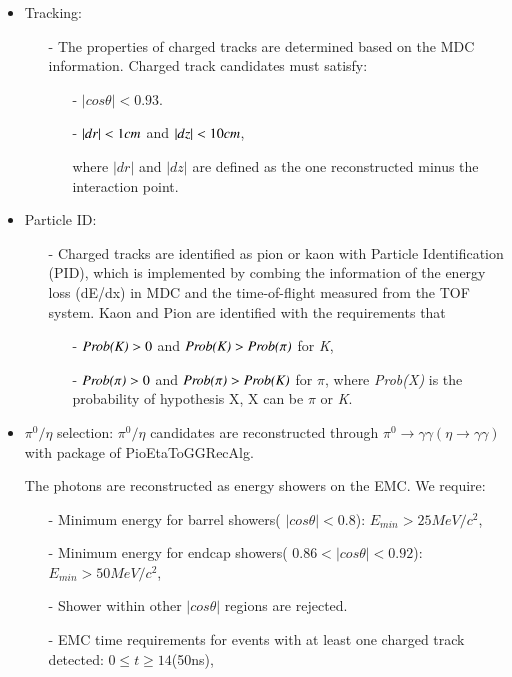 \begin{itemize}
	\item Tracking:
		\begin{itemize}
			\item[-] The properties of charged tracks are determined based on the MDC information. Charged track candidates must satisfy:
				\begin{itemize}
					\item[-] $|cos\theta| < 0.93$.
					\item[-] $|dr| < \boldmath 1cm$ and $|dz| < \boldmath 10cm$,

						where $|dr|$ and $|dz|$ are defined as the one reconstructed minus the interaction point.
				\end{itemize}
		\end{itemize}
	\item Particle ID:
		\begin{itemize}
			\item[-] Charged tracks are identified as pion or kaon with Particle Identification (PID), which is implemented by combing the information of the energy loss (dE/dx) in MDC and the time-of-flight measured from
				the TOF system. Kaon and Pion are identified with the requirements that 
				\begin{itemize}
					\item[-] $\emph{Prob(K)} > 0$ and $\emph{Prob(K)} > \emph{Prob($\pi$)}$ for \emph{K},
					\item[-] $\emph{Prob($\pi$)} > 0$ and $\emph{Prob($\pi$)} > \emph{Prob(K)}$ for \emph{$\pi$},
						where \emph{Prob(X)} is the probability of hypothesis X, X can be \emph{$\pi$} or \emph{K}.
				\end{itemize}
		\end{itemize}
    \item $\pi^{0}/\eta$ selection: $\pi^{0}/\eta$ candidates are reconstructed through $\pi^{0} \rightarrow \gamma\gamma (\eta \rightarrow \gamma\gamma)$ with package of PioEtaToGGRecAlg.
		

		The photons are reconstructed as energy showers on the EMC. We require:
		\begin{itemize}
			\item[-] Minimum energy for barrel showers( $|cos\theta| < 0.8$): $E_{min} >25MeV/c^{2}$,
			\item[-] Minimum energy for endcap showers( $0.86 < |cos\theta| < 0.92$): $E_{min} >50MeV/c^{2}$,
			\item[-] Shower within other $|cos\theta|$ regions are rejected.
			\item[-] EMC time requirements for events with at least one charged track detected: $0 \le t \ge 14 $(50ns),
		\end{itemize}


\end{itemize}
